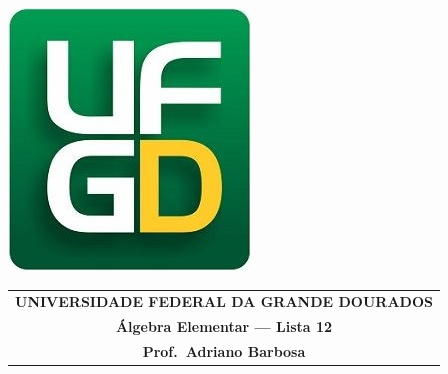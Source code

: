 \documentclass[a4paper,5pt]{amsbook}
\begin{document}
\thispagestyle{empty}
\pagestyle{empty}
\begin{minipage}[h]{0.14\textwidth}
	\includegraphics[scale=0.24]{../ufgd.png}
\end{minipage}
\begin{minipage}[h]{\textwidth}
\begin{tabular}{c}
{{\bf UNIVERSIDADE FEDERAL DA GRANDE DOURADOS}}\\
{{\bf \'Algebra Elementar --- Lista 12}}\\
{{\bf Prof.\ Adriano Barbosa}}\\
\end{tabular}
\vspace{-0.45cm}
%
\end{minipage}

\end{document}
